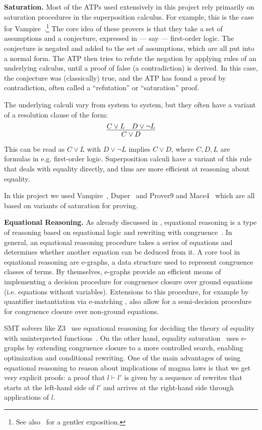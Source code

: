 \textbf{Saturation.}
Most of the ATPs used extensively in this project rely primarily on saturation procedures in the superposition calculus.
For example, this is the case for Vampire~\cite{DBLP:conf/cav/KovacsV13}.\footnote{See also~\cite{DBLP:journals/cacm/BentkampBNTVW23} for a gentler exposition.}
The core idea of these provers is that they take a set of assumptions and a conjecture, expressed in --- say --- first-order logic.
The conjecture is negated and added to the set of assumptions, which are all put into a normal form.
The ATP then tries to refute the negation by applying rules of an underlying calculus, until a proof of false (a contradiction) is derived.
In this case, the conjecture was (classically) true, and the ATP has found a proof by contradiction, often called a ``refutation'' or ``saturation'' proof.

The underlying calculi vary from system to system, but they often have a variant of a resolution clause of the form:
\[\infer{C \lor D}{C \lor L \quad D \lor \neg L} \]
This can be read as $C \lor L$ with $D \lor \neg L$ implies $C \lor D$, where $C, D, L$ are formulas in e.g. first-order logic.
Superposition calculi have a variant of this rule that deals with equality directly, and thus are more efficient at reasoning about equality.

In this project we used Vampire~\cite{DBLP:conf/cav/KovacsV13}, Duper~\cite{DBLP:conf/itp/CluneQBA24} and Prover9 and Mace4~\cite{prover9-mace4} which are all based on variants of saturation for proving.

\textbf{Equational Reasoning.} As already discussed in , equational reasoning is a type of reasoning based on equational logic and rewriting with congruence~\cite{term-rewriting}.
In general, an equational reasoning procedure takes a series of equations and determines whether another equation can be deduced from it.
A core tool in equational reasoning are e-graphs, a data structure used to represent congruence classes of terms.
By themselves, e-graphs provide an efficient means of implementing a decision procedure for congruence closure over ground equations (i.e. equations without variables).
Extensions to this procedure, for example by quantifier instantiation via e-matching \cite{DBLP:conf/cade/MouraB07}, also allow for a semi-decision procedure for congruence closure over non-ground equations.

SMT solvers like Z3~\cite{DBLP:conf/tacas/MouraB08} use equational reasoning for deciding the theory of equality with uninterpreted functions~\cite{DBLP:series/txtcs/KroeningS16,DBLP:conf/cade/MouraB07}.
On the other hand, equality saturation~\cite{DBLP:journals/pacmpl/WillseyNWFTP21} uses e-graphs by extending congruence closure to a more controlled search, enabling optimization and conditional rewriting.
One of the main advantages of using equational reasoning to reason about implications of magma laws is that we get very explicit proofs: a proof that $l \vdash l'$ is given by a sequence of rewrites that starts at the left-hand side of $l'$ and arrives at the right-hand side through applications of $l$.

